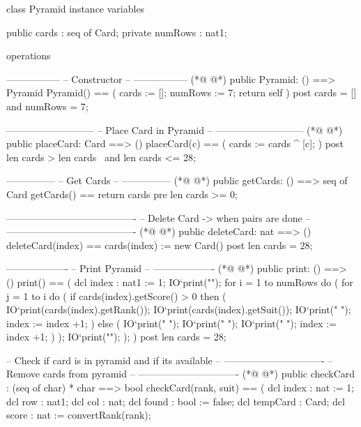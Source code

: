 \begin{vdmpp}[breaklines=true]
class Pyramid
 instance variables
   
   public cards : seq of Card;
   private numRows : nat1;
  
 operations
 
  -----------------
  -- Constructor --
  -----------------
(*@
\label{Pyramid:12}
@*)
  public Pyramid: ()  ==> Pyramid
   Pyramid() ==
   (
    cards := [];
    numRows := 7;
    return self
   )
  post cards = [] and numRows = 7;
   
  ---------------------------
  -- Place Card in Pyramid --
  ---------------------------
(*@
\label{placeCard:24}
@*)
  public placeCard: Card ==> ()
   placeCard(c) == 
   (
    cards := cards ^ [c];
   )
  post len cards >  len cards~ and len cards <= 28;
  
  ---------------
  -- Get Cards --
  ---------------
(*@
\label{getCards:34}
@*)
  public getCards: () ==> seq of Card
   getCards() == return cards
  pre len cards >= 0;
  
  ---------------------------------------- 
  -- Delete Card -> when pairs are done --
  ----------------------------------------
(*@
\label{deleteCard:41}
@*)
  public deleteCard: nat ==> ()
   deleteCard(index) == cards(index) := new Card() 
  post len cards = 28;
  
  -------------------
  -- Print Pyramid --
  -------------------
(*@
\label{print:48}
@*)
  public print: () ==> ()
   print() == 
   (
    dcl index : nat1 := 1;
    IO`print("\n");
    for i = 1 to numRows do
    (
      for j = 1 to i do 
      (
       if cards(index).getScore() > 0 then
       (
         IO`print(cards(index).getRank());
         IO`print(cards(index).getSuit());
         IO`print("        ");
         index := index +1;
        )
        else
        (
         IO`print(" ");
         IO`print("   ");
         IO`print("        ");
         index := index +1;
        )
      );
      IO`print("\n");
    );
   )
  post len cards = 28;
  
 
 
  -- Check if card is in pyramid and if its available --
  -------------------------------
  -- Remove cards from pyramid --
  -------------------------------
(*@
\label{checkCard:83}
@*)
  public checkCard : (seq of char) * char ==> bool
   checkCard(rank, suit)  == 
   (
    dcl index : nat := 1;
    dcl row : nat1;
    dcl col : nat;
    dcl found : bool := false;
    dcl tempCard : Card;
    dcl score : nat := convertRank(rank);
    

\end{vdmpp}
